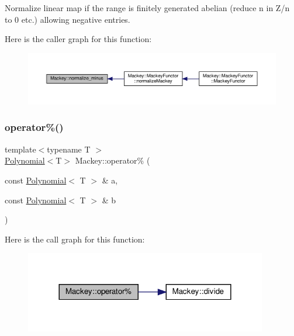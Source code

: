Normalize linear map if the range is finitely generated abelian (reduce n in Z/n to 0 etc.) allowing negative entries. 

Here is the caller graph for this function\+:\nopagebreak
\begin{figure}[H]
\begin{center}
\leavevmode
\includegraphics[width=350pt]{namespaceMackey_a463bb762b4edc2f283e8d1c0c466aedf_icgraph}
\end{center}
\end{figure}
\mbox{\label{namespaceMackey_adb145e729d40138080b5a58d26a89388}} 
\subsubsection{\texorpdfstring{operator\%()}{operator\%()}}
{\footnotesize\ttfamily template$<$typename T $>$ \\
\hyperlink{classMackey_1_1Polynomial}{Polynomial}$<$T$>$ Mackey\+::operator\% (\begin{DoxyParamCaption}\item[{const \hyperlink{classMackey_1_1Polynomial}{Polynomial}$<$ T $>$ \&}]{a,  }\item[{const \hyperlink{classMackey_1_1Polynomial}{Polynomial}$<$ T $>$ \&}]{b }\end{DoxyParamCaption})}

Here is the call graph for this function\+:\nopagebreak
\begin{figure}[H]
\begin{center}
\leavevmode
\includegraphics[width=300pt]{namespaceMackey_adb145e729d40138080b5a58d26a89388_cgraph}
\end{center}
\end{figure}
\mbox{\label{namespaceMackey_a7bbd83e8170a608aea65f7d916b4bc6d}} 
